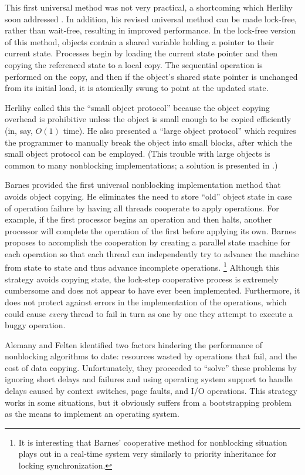 This first universal method was not very practical, a shortcoming
which Herlihy soon addressed \cite{Herlihy93}.  In addition, his
revised universal
method can be made lock-free, rather than wait-free, resulting in
improved performance.  In the lock-free version of this method,
objects contain a shared variable
holding a pointer to their current state.  Processes begin by loading
the current state pointer and then copying the referenced state to a
local copy.  The sequential operation is performed on the
copy, and then if the object's shared state pointer is unchanged from
its initial load, it is atomically swung to point at the updated state.

Herlihy called this the ``small object protocol'' because the object
copying overhead is prohibitive unless the object is small enough to
be copied efficiently (in, say, $O(1)$ time).  He also presented a
``large object protocol'' which requires the programmer to
manually break the object into small blocks, after which the small
object protocol can be employed. 
(This trouble with large objects is
common to many nonblocking implementations; a solution is presented
in .)

Barnes \cite{Barnes93} provided the first universal nonblocking implementation
method that avoids object copying.  He eliminates the
need to store ``old'' object
state in case of operation failure by having all threads cooperate to
apply operations.  For example, if the first processor begins an operation
and then halts, another processor will complete the operation of the first
before applying its own.  Barnes proposes to accomplish the
cooperation by creating a parallel state machine for each operation
so that each thread can independently try to advance the machine from state
to state and thus advance incomplete operations.%
\footnote{It is interesting that Barnes' cooperative method
  for nonblocking 
  situation plays out in a real-time system very similarly to priority
  inheritance for locking synchronization.}
Although this strategy avoids
copying state, the lock-step cooperative process is extremely
cumbersome and does not appear to have ever been implemented.
Furthermore, it does not protect against errors in the implementation
of the operations, which could cause \emph{every} thread to fail in turn
as one by one they attempt to execute a buggy operation.

Alemany and Felten \cite{AlemanyFe92} identified two factors hindering the
performance of nonblocking algorithms to date: resources wasted by operations
that fail, and the cost of data copying.  Unfortunately, they
proceeded to
``solve'' these problems by ignoring short delays and failures and
using operating system support to handle delays caused by
context switches, page faults, and
I/O operations.  This strategy works in some situations, but it obviously suffers
from a bootstrapping problem as the means to implement an operating system.

